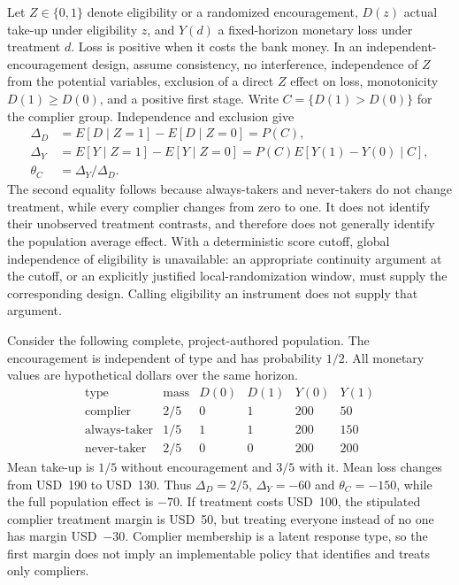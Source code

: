 Let $Z\in\{0,1\}$ denote eligibility or a randomized encouragement, $D(z)$
actual take-up under eligibility $z$, and $Y(d)$ a fixed-horizon monetary loss
under treatment $d$. Loss is positive when it costs the bank money. In an
independent-encouragement design, assume consistency, no interference,
independence of $Z$ from the potential variables, exclusion of a direct $Z$
effect on loss, monotonicity $D(1)\geq D(0)$, and a positive first stage.
Write $C=\{D(1)>D(0)\}$ for the complier group. Independence and exclusion give
\begin{align}
 \Delta_D&=E[D\mid Z=1]-E[D\mid Z=0]=P(C),\nonumber\\
 \Delta_Y&=E[Y\mid Z=1]-E[Y\mid Z=0]
          =P(C)E[Y(1)-Y(0)\mid C],\nonumber\\
 \theta_C&=\Delta_Y/\Delta_D.
 \label{exec22:riv-late}
\end{align}
The second equality follows because always-takers and never-takers do not change
treatment, while every complier changes from zero to one. It does not identify
their unobserved treatment contrasts, and therefore does not generally identify
the population average effect. With a deterministic score cutoff, global
independence of eligibility is unavailable: an appropriate continuity argument
at the cutoff, or an explicitly justified local-randomization window, must supply
the corresponding design. Calling eligibility an instrument does not supply that
argument.

Consider the following complete, project-authored population. The encouragement
is independent of type and has probability $1/2$. All monetary values are
hypothetical dollars over the same horizon.\citep{exec22_riv_reference}
\begin{equation}
\begin{array}{c|c|cc|rr}
 \text{type}&\text{mass}&D(0)&D(1)&Y(0)&Y(1)\\\hline
 \text{complier}&2/5&0&1&200&50\\
 \text{always-taker}&1/5&1&1&200&150\\
 \text{never-taker}&2/5&0&0&200&200
\end{array}
\label{exec22:riv-population}
\end{equation}
Mean take-up is $1/5$ without encouragement and $3/5$ with it. Mean loss changes
from USD~190 to USD~130. Thus $\Delta_D=2/5$, $\Delta_Y=-60$ and
$\theta_C=-150$, while the full population effect is $-70$. If treatment costs
USD~100, the stipulated complier treatment margin is USD~50, but treating everyone
instead of no one has margin USD~$-30$. Complier membership is a latent response
type, so the first margin does not imply an implementable policy that identifies
and treats only compliers.

